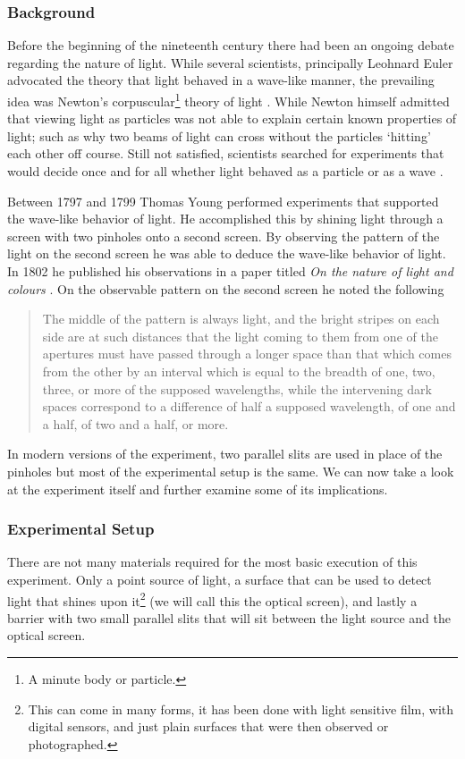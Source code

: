 \documentclass[authoryearcitations]{UoYCSproject}
\begin{document}
\subsubsection{Background}
Before the beginning of the nineteenth century there had been an ongoing debate regarding the nature of light. While
several scientists, principally Leohnard Euler advocated the theory that light behaved in a wave-like manner, the prevailing 
idea was Newton's corpuscular\footnote{A minute body or particle.} theory of light \cite{history}. While Newton himself admitted 
that viewing light as particles was not able to explain certain known properties of light; such as why two beams of light
can cross without the particles `hitting' each other off course. Still not satisfied, scientists searched for experiments that
would decide once and for all whether light behaved as a particle or as a wave \cite{history}. 

Between 1797 and 1799 Thomas Young performed experiments that supported the wave-like behavior of light. He accomplished this
by shining light through a screen with two pinholes onto a second screen. By observing the pattern of the light on the second 
screen he was able to deduce the wave-like behavior of light. In 1802 he published his observations in a paper titled \emph{On
the nature of light and colours} \cite{ralph}. On the observable pattern on the second screen he noted the following

\begin{quote}
The middle of the pattern is always light, and the bright stripes on each side are at such distances that the light coming to them from one of the apertures must have passed through a longer space than that which comes from the other by an interval which is equal to the breadth of one, two, three, or more of the supposed wavelengths, while the intervening dark spaces correspond to a difference of half a supposed wavelength, of one and a half, of two and a half, or more.
\end{quote}


In modern versions of the experiment, two parallel slits are used in place of the pinholes but most of the experimental setup 
is the same. We can now take a look at the experiment itself and further examine some of its implications. 

\subsubsection{Experimental Setup}
There are not many materials required for the most basic execution of this experiment. Only a point source of light, a
surface that can be used to detect light that shines upon it\footnote{This can come in many forms, it has been done with light
sensitive film, with digital sensors, and just plain surfaces that were then observed or photographed.} (we will call this the 
optical screen), and lastly a 
barrier with two small parallel slits that will sit between the light source and the optical screen. 
\end{document}

